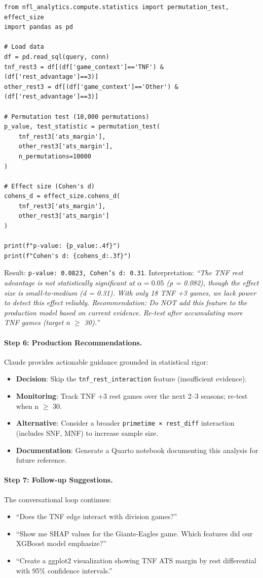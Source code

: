 \begin{verbatim}
from nfl_analytics.compute.statistics import permutation_test, effect_size
import pandas as pd

# Load data
df = pd.read_sql(query, conn)
tnf_rest3 = df[(df['game_context']=='TNF') & (df['rest_advantage']==3)]
other_rest3 = df[(df['game_context']=='Other') & (df['rest_advantage']==3)]

# Permutation test (10,000 permutations)
p_value, test_statistic = permutation_test(
    tnf_rest3['ats_margin'],
    other_rest3['ats_margin'],
    n_permutations=10000
)

# Effect size (Cohen's d)
cohens_d = effect_size.cohens_d(
    tnf_rest3['ats_margin'],
    other_rest3['ats_margin']
)

print(f"p-value: {p_value:.4f}")
print(f"Cohen's d: {cohens_d:.3f}")
\end{verbatim}

Result: \texttt{p-value: 0.0823, Cohen's d: 0.31}. Interpretation: \textit{``The TNF rest advantage is not statistically significant at $\alpha = 0.05$ (p = 0.082), though the effect size is small‑to‑medium (d = 0.31). With only 18 TNF +3 games, we lack power to detect this effect reliably. Recommendation: Do NOT add this feature to the production model based on current evidence. Re‑test after accumulating more TNF games (target n $\geq$ 30).''}

\paragraph{Step 6: Production Recommendations.}
Claude provides actionable guidance grounded in statistical rigor:
\begin{itemize}
\item \textbf{Decision}: Skip the \texttt{tnf\_rest\_interaction} feature (insufficient evidence).
\item \textbf{Monitoring}: Track TNF +3 rest games over the next 2--3 seasons; re‑test when n $\geq$ 30.
\item \textbf{Alternative}: Consider a broader \texttt{primetime × rest\_diff} interaction (includes SNF, MNF) to increase sample size.
\item \textbf{Documentation}: Generate a Quarto notebook documenting this analysis for future reference.
\end{itemize}

\paragraph{Step 7: Follow‑up Suggestions.}
The conversational loop continues:
\begin{itemize}
\item ``Does the TNF edge interact with division games?''
\item ``Show me SHAP values for the Giants‑Eagles game. Which features did our XGBoost model emphasize?''
\item ``Create a ggplot2 visualization showing TNF ATS margin by rest differential with 95\% confidence intervals.''
\end{itemize}

